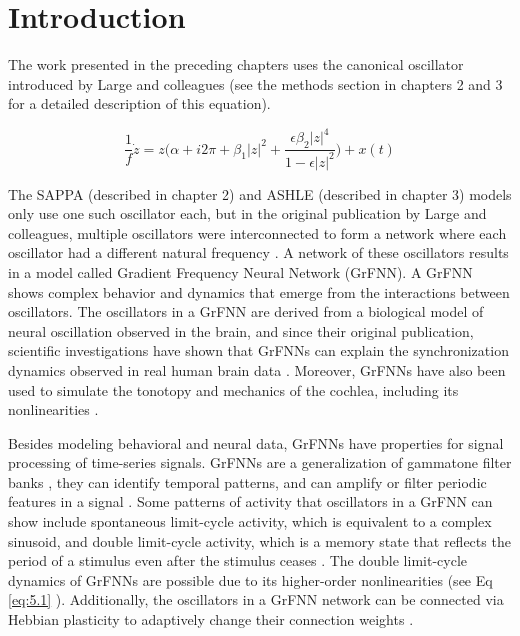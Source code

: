 \documentclass{report}
\begin{document}
\section{Introduction}

The work presented in the preceding chapters uses the canonical oscillator introduced by Large and colleagues \cite{large2010canonical} (see the methods section in chapters 2 and 3 for a detailed description of this equation).  

\begin{equation}
\frac{1}{f}\dot{z} = z\bigg(\alpha + i2\pi + \beta_1|z|^2 + \frac{\epsilon\beta_2|z|^4}{1-\epsilon|z|^2}\bigg) + x(t) \label{eq:5.1}
\end{equation}

The SAPPA (described in chapter 2) and ASHLE (described in chapter 3) models only use one such oscillator each, but in the original publication by Large and colleagues, multiple oscillators were interconnected to form a network where each oscillator had a different natural frequency \cite{large2010canonical}. A network of these oscillators results in a model called Gradient Frequency Neural Network (GrFNN). A GrFNN shows complex behavior and dynamics that emerge from the interactions between oscillators. The oscillators in a GrFNN are derived from a biological model of neural oscillation observed in the brain, and since their original publication, scientific investigations have shown that GrFNNs can explain the synchronization dynamics observed in real human brain data \cite{tal2017neural}. Moreover, GrFNNs have also been used to simulate the tonotopy and mechanics of the cochlea, including its nonlinearities \cite{lerud2019canonical}.

Besides modeling behavioral and neural data, GrFNNs have properties for signal processing of time-series signals\cite{kim2015signal}. GrFNNs are a generalization of gammatone filter banks \cite{large2015learning}, they can identify temporal patterns, and can amplify or filter periodic features in a signal \cite{kim2015signal}. Some patterns of activity that oscillators in a GrFNN can show include spontaneous limit-cycle activity, which is equivalent to a complex sinusoid, and double limit-cycle activity, which is a memory state that reflects the period of a stimulus even after the stimulus ceases \cite{kim2015signal}. The double limit-cycle dynamics of GrFNNs are possible due to its higher-order nonlinearities (see Eq \eqref{eq:5.1} \cite{large2010canonical, kim2015signal}). Additionally, the oscillators in a GrFNN network can be connected via Hebbian plasticity to adaptively change their connection weights \cite{lambert2016adaptive, kim2017dynamical}. 
\end{document}
